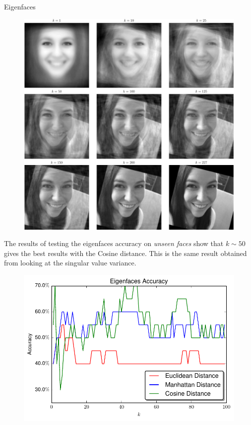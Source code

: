 \documentclass[final]{beamer}
\newlength{\onecolwid}
\begin{document}
\begin{frame}[t]
\begin{columns}[t]
\begin{column}{\onecolwid}
\begin{block}{Eigenfaces}
\begin{figure}
\centering
  \centering
  \includegraphics[width=.85\linewidth]{../data/Face_Reconstruct.pdf}
  \label{fig:face_recon}
\end{figure}

\vspace{-1em}
The results of testing the eigenfaces accuracy on {\em unseen faces} show that $k \sim 50$ gives the best results with the Cosine distance. This is the same result obtained from looking at the singular value variance.

\begin{figure}
\centering
  \centering
  \includegraphics[width=.85\linewidth]{../data/Accuracy.pdf}
  \label{fig:eig_acc}
\end{figure}


\end{block}
\end{column}
\end{columns}
\end{frame}
\end{document}
